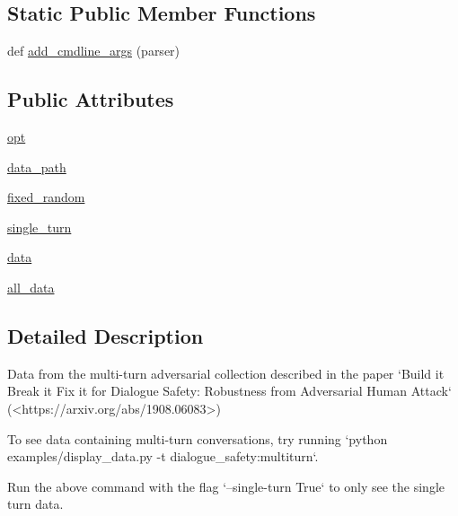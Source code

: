 \subsection*{Static Public Member Functions}
\begin{DoxyCompactItemize}
\item 
def \hyperlink{classparlai_1_1tasks_1_1dialogue__safety_1_1agents_1_1MultiturnTeacher_aa7d5691d1e80f9104f21698b8348b55e}{add\+\_\+cmdline\+\_\+args} (parser)
\end{DoxyCompactItemize}
\subsection*{Public Attributes}
\begin{DoxyCompactItemize}
\item 
\hyperlink{classparlai_1_1tasks_1_1dialogue__safety_1_1agents_1_1MultiturnTeacher_a1e7f1696e4385c96f090de43bbc6333c}{opt}
\item 
\hyperlink{classparlai_1_1tasks_1_1dialogue__safety_1_1agents_1_1MultiturnTeacher_a6ae7a9106d6fbaf0c03f7501975973c6}{data\+\_\+path}
\item 
\hyperlink{classparlai_1_1tasks_1_1dialogue__safety_1_1agents_1_1MultiturnTeacher_a09a1e912d184a8544bfd9b053e05a14d}{fixed\+\_\+random}
\item 
\hyperlink{classparlai_1_1tasks_1_1dialogue__safety_1_1agents_1_1MultiturnTeacher_ae472ac0fed277b530f8e38b33e0eb837}{single\+\_\+turn}
\item 
\hyperlink{classparlai_1_1tasks_1_1dialogue__safety_1_1agents_1_1MultiturnTeacher_ae3535d76dde8df6a43799db8496c1a04}{data}
\item 
\hyperlink{classparlai_1_1tasks_1_1dialogue__safety_1_1agents_1_1MultiturnTeacher_a6a2355fab338fcf40b7eb1b183caa526}{all\+\_\+data}
\end{DoxyCompactItemize}


\subsection{Detailed Description}
\begin{DoxyVerb}Data from the multi-turn adversarial collection described in the paper `Build it
Break it Fix it for Dialogue Safety: Robustness from Adversarial Human Attack`
(<https://arxiv.org/abs/1908.06083>)

To see data containing multi-turn conversations, try running
`python examples/display_data.py -t dialogue_safety:multiturn`.

Run the above command with the flag `--single-turn True` to only see the
single turn data.
\end{DoxyVerb}
 

